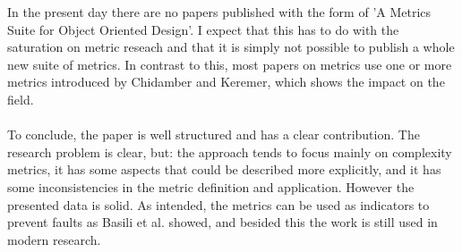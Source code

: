 In the present day there are no papers published with the form of 'A Metrics Suite for Object Oriented Design'. I expect that this has
to do with the saturation on metric reseach and that it is simply not possible to publish a whole new suite of metrics.
In contrast to this, most papers on metrics use one or more metrics introduced by Chidamber and Keremer, which shows the
impact on the field.

\paragraph{}
To conclude, the paper is well structured and has a clear contribution. The research problem is clear, but: the
approach tends to focus mainly on complexity metrics, it has some aspects that could be described more explicitly, and it
has some inconsistencies in the metric definition and application. However the presented data is solid.
As intended, the metrics can be used as indicators to prevent faults as Basili et al. \autocite{BASILI} showed, and
besided this the work is still used in modern research.
